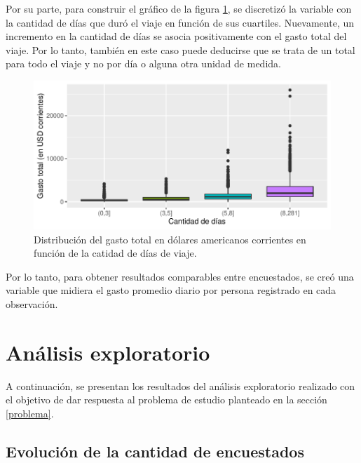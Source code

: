 \documentclass[
]{article}
\begin{document}
Por su parte, para construir el gráfico de la figura
\ref{fig:gasto_estadia}, se discretizó la variable con la cantidad de
días que duró el viaje en función de sus cuartiles. Nuevamente, un
incremento en la cantidad de días se asocia positivamente con el gasto
total del viaje. Por lo tanto, también en este caso puede deducirse que
se trata de un total para todo el viaje y no por día o alguna otra
unidad de medida.

\begin{figure}[H]

{\centering \includegraphics{Informe-Proyectofinal_files/figure-latex/gasto_estadia-1} 

}

\caption{Distribución del gasto total en dólares americanos corrientes en función de la catidad de días de viaje.}\label{fig:gasto_estadia}
\end{figure}

Por lo tanto, para obtener resultados comparables entre encuestados, se
creó una variable que midiera el gasto promedio diario por persona
registrado en cada observación.

\hypertarget{anuxe1lisis-exploratorio}{%
\section{\texorpdfstring{Análisis exploratorio
\label{exploracion}}{Análisis exploratorio }}\label{anuxe1lisis-exploratorio}}

A continuación, se presentan los resultados del análisis exploratorio
realizado con el objetivo de dar respuesta al problema de estudio
planteado en la sección \ref{problema}.

\hypertarget{evoluciuxf3n-de-la-cantidad-de-encuestados}{%
\subsection{Evolución de la cantidad de
encuestados}\label{evoluciuxf3n-de-la-cantidad-de-encuestados}}
\end{document}
